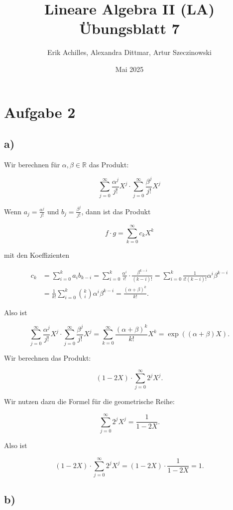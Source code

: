 \documentclass{article}
\title{Lineare Algebra II (LA) Übungsblatt 7}
\author{Erik Achilles, Alexandra Dittmar, Artur Szeczinowski}
\date{Mai 2025}
\newcommand{\RR}{\mathbb{R}}
\begin{document}

\section*{Aufgabe 2}
\subsection*{a)}
Wir berechnen für $\alpha, \beta \in \RR$ das Produkt:

\[
  \sum_{j=0}^{\infty} \frac{\alpha^j}{j!} X^j \cdot
  \sum_{j=0}^{\infty} \frac{\beta^j}{j!} X^j
\]

Wenn $a_j = \frac{\alpha^j}{j!}$ und $b_j = \frac{\beta^j}{j!}$, dann ist
das Produkt

\[
  f \cdot g = \sum_{k=0}^{\infty} c_k X^k
\]

mit den Koeffizienten

\[
  \begin{aligned}
    c_k & = \sum_{i=0}^{k} a_i b_{k-i} = \sum_{i=0}^{k} \frac{\alpha^i}{i!} \cdot \frac{\beta^{k-i}}{(k-i)!} = \sum_{i=0}^{k} \frac{1}{i! (k-i)!} \alpha^i \beta^{k-i} \\
        & = \frac{1}{k!} \sum_{i=0}^{k} \binom{k}{i} \alpha^i \beta^{k-i} = \frac{(\alpha + \beta)^k}{k!}.
  \end{aligned}
\]

Also ist

\[
  \sum_{j=0}^{\infty} \frac{\alpha^j}{j!} X^j \cdot \sum_{j=0}^{\infty} \frac{\beta^j}{j!} X^j
  = \sum_{k=0}^{\infty} \frac{(\alpha + \beta)^k}{k!} X^k = \exp((\alpha + \beta) X).
\]

Wir berechnen das Produkt:

\[
  (1 - 2X) \cdot \sum_{j=0}^{\infty} 2^j X^j.
\]

Wir nutzen dazu die Formel für die geometrische Reihe:

\[
  \sum_{j=0}^{\infty} 2^j X^j = \frac{1}{1 - 2X}.
\]

Also ist

\[
  (1 - 2X) \cdot \sum_{j=0}^{\infty} 2^j X^j = (1 - 2X) \cdot \frac{1}{1 - 2X} = 1.
\]


\newpage
\subsection*{b)}
\end{document}
